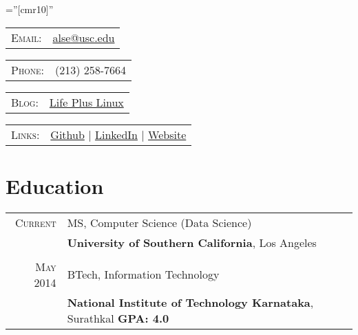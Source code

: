 \documentclass[a4paper,10pt]{article} %
\begin{document}
\pagestyle{empty} %

\font\fb=''[cmr10]'' %


\par{\bigskip\par} %

\begin{tabular}{rl}
\textsc{Email:} & \href{mailto:alse@usc.edu}{alse@usc.edu}\\
\end{tabular}
\hfill
\begin{tabular}{rl}
\textsc{Phone:} & (213) 258-7664\\
\end{tabular}
\hfill
\begin{tabular}{rl}
\textsc{Blog:} & \href{http://lifepluslinux.blogspot.in}{Life Plus Linux}
\end{tabular}

\begin{tabular}{rl}
\textsc{Links:} & \href{http://github.com/alseambusher}{Github} | \href{http://in.linkedin.com/pub/suresh-alse/4a/956/682}{LinkedIn} | \href{http://alseambusher.github.io}{Website} 
\end{tabular}


\section{Education}
\renewcommand{\arraystretch}{0.98}%
\begin{tabular}{rl}	

\textsc{Current} & MS, Computer Science (Data Science)\\
&\textbf{University of Southern California}, Los Angeles\\
\\

\textsc{May} 2014 & BTech, Information Technology\\
&\textbf{National Institute of Technology Karnataka}, Surathkal \hspace{2cm} \textbf{GPA: 4.0}

\end{tabular}
\end{document}
